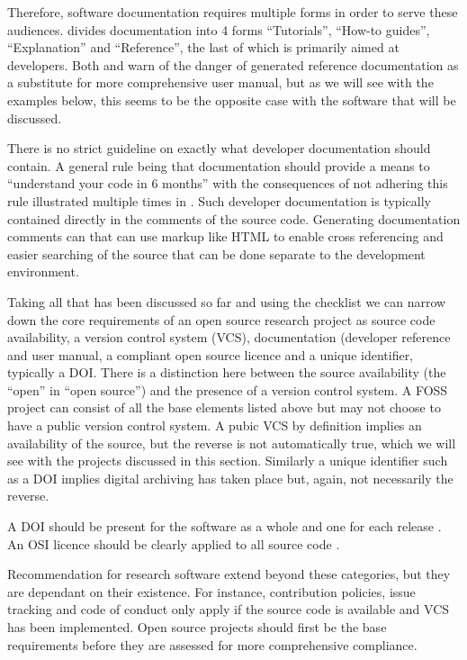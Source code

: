 Therefore, software documentation requires multiple forms in order to serve these audiences. \textcite{procida_diataxis_2025} divides documentation into 4 forms ``Tutorials'', ``How-to guides'', ``Explanation'' and ``Reference'', the last of which is primarily aimed at developers. Both \textcite[\href{https://diataxis.fr/reference/}{\#reference}]{procida_diataxis_2025} and \textcite[Section 6.2]{stallman_gnu_1992} warn of the danger of generated reference documentation as a substitute for more comprehensive user manual, but as we will see with the examples below, this seems to be the opposite case with the software that will be discussed.


There is no strict guideline on exactly what developer documentation should contain. A general rule being that documentation should provide a means to ``understand your code in 6 months'' \cite{writethedocs_sowftware_2025} with the consequences of not adhering this rule illustrated multiple times in \textcite{perkel_challenge_2020}. Such developer documentation is typically contained directly in the comments of the source code. Generating documentation comments can that can use markup like HTML to enable cross referencing and easier searching of the source that can be done separate to the development environment.


Taking all that has been discussed so far and using the  checklist we can narrow down the core requirements of an open source research project as source code availability, a version control system (VCS), documentation (developer reference and user manual, a compliant open source licence and a unique identifier, typically a DOI. There is a distinction here between the source availability (the ``open'' in ``open source'') and the presence of a version control system. A FOSS project can consist of all the base elements listed above but may not choose to have a public version control system. A pubic VCS by definition implies an availability of the source, but the reverse is not automatically true, which we will see with the projects discussed in this section. Similarly a unique identifier such as a DOI implies digital archiving has taken place but, again, not necessarily the reverse.

A DOI should be present for the software as a whole and one for each release \cite{smith_software_2016}. An OSI licence should be clearly applied to all source code \cite{hong_choosing_2025}.

Recommendation for research software extend beyond these categories, but they are dependant on their existence. For instance, contribution policies, issue tracking and code of conduct only apply if the source code is available and VCS has been implemented. Open source projects should first be the base requirements before they are assessed for more comprehensive compliance. 

